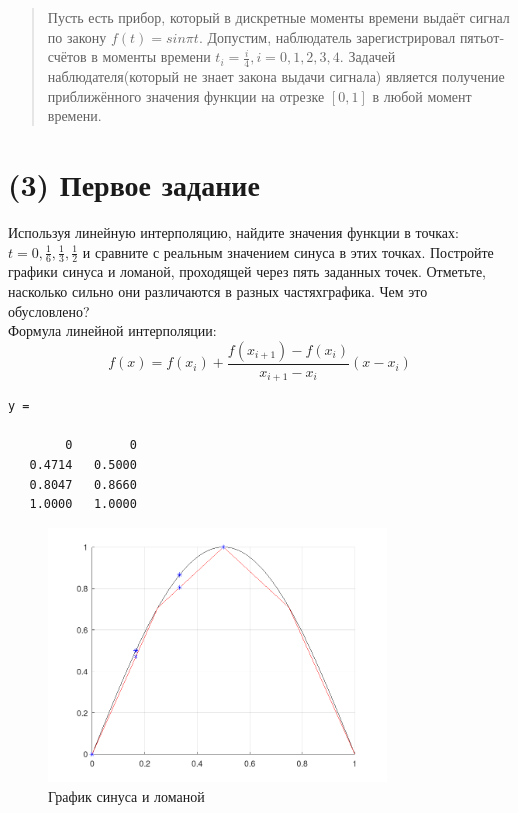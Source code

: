 \maketitle
\tableofcontents
\newpage

\begin{otherlanguage}{russian}
  \begin{abstract}
    Пусть есть прибор, который в дискретные моменты времени выдаёт сигнал по закону $f(t) = sin \pi t$. Допустим, наблюдатель зарегистрировал пятьотсчётов в моменты времени $t_{i} = \frac{i}{4}, i = 0, 1, 2, 3, 4$. Задачей наблюдателя(который не знает закона выдачи сигнала) является получение приближённого значения функции на отрезке $[0, 1]$ в любой момент времени.
  \end{abstract}
\end{otherlanguage}

\section{(3) Первое задание}

Используя линейную интерполяцию, найдите значения функции в точках: $t = 0, \frac{1}{6}, \frac{1}{3}, \frac{1}{2}$ и сравните с реальным значением синуса в этих точках. Постройте графики синуса и ломаной, проходящей через пять заданных точек. Отметьте, насколько сильно они различаются в разных частяхграфика. Чем это обусловлено?\\[5mm]

Формула линейной интерполяции:
\[
  f(x) = f(x_{i}) + \frac{f(x_{i+1}) - f(x_{i})}{x_{i+1} - x_{i}}(x - x_{i})
\]


\begin{lstlisting}[backgroundcolor=\color{cyan}]
  y =

        0        0
   0.4714   0.5000
   0.8047   0.8660
   1.0000   1.0000
 \end{lstlisting}

 \begin{figure}[H]
   \caption{График синуса и ломаной}
   \label{fig:plot_1}
   \centering
   \includegraphics[width=0.8\textwidth]{images/first_task_1.png}
\end{figure}

